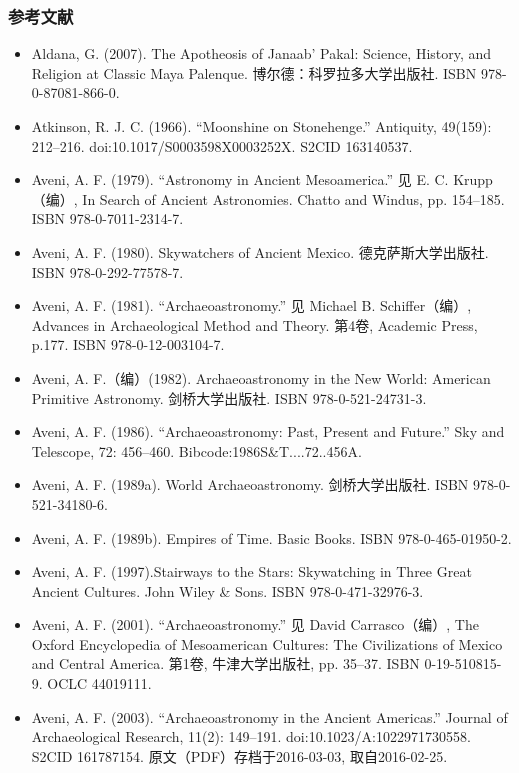 \subsubsection{参考文献}
\begin{itemize}
    \item Aldana, G. (2007). The Apotheosis of Janaab' Pakal: Science, History, and Religion at Classic Maya Palenque. 博尔德：科罗拉多大学出版社. ISBN 978-0-87081-866-0.
    \item Atkinson, R. J. C. (1966). “Moonshine on Stonehenge.” Antiquity, 49(159): 212–216. doi:10.1017/S0003598X0003252X. S2CID 163140537.
    \item Aveni, A. F. (1979). “Astronomy in Ancient Mesoamerica.” 见 E. C. Krupp（编）, In Search of Ancient Astronomies. Chatto and Windus, pp. 154–185. ISBN 978-0-7011-2314-7.
    \item Aveni, A. F. (1980). Skywatchers of Ancient Mexico. 德克萨斯大学出版社. ISBN 978-0-292-77578-7.
    \item Aveni, A. F. (1981). “Archaeoastronomy.” 见 Michael B. Schiffer（编）, Advances in Archaeological Method and Theory. 第4卷, Academic Press, p.177. ISBN 978-0-12-003104-7.
    \item Aveni, A. F.（编）(1982). Archaeoastronomy in the New World: American Primitive Astronomy. 剑桥大学出版社. ISBN 978-0-521-24731-3.
    \item Aveni, A. F. (1986). “Archaeoastronomy: Past, Present and Future.” Sky and Telescope, 72: 456–460. Bibcode:1986S\&T....72..456A.
    \item Aveni, A. F. (1989a). World Archaeoastronomy. 剑桥大学出版社. ISBN 978-0-521-34180-6.
    \item Aveni, A. F. (1989b). Empires of Time. Basic Books. ISBN 978-0-465-01950-2.
    \item Aveni, A. F. (1997).Stairways to the Stars: Skywatching in Three Great Ancient Cultures. John Wiley \& Sons. ISBN 978-0-471-32976-3.
    \item Aveni, A. F. (2001). “Archaeoastronomy.” 见 David Carrasco（编）, The Oxford Encyclopedia of Mesoamerican Cultures: The Civilizations of Mexico and Central America. 第1卷, 牛津大学出版社, pp. 35–37. ISBN 0-19-510815-9. OCLC 44019111.
    \item Aveni, A. F. (2003). “Archaeoastronomy in the Ancient Americas.” Journal of Archaeological Research, 11(2): 149–191. doi:10.1023/A:1022971730558. S2CID 161787154. 原文（PDF）存档于2016-03-03, 取自2016-02-25.
\end{itemize}



